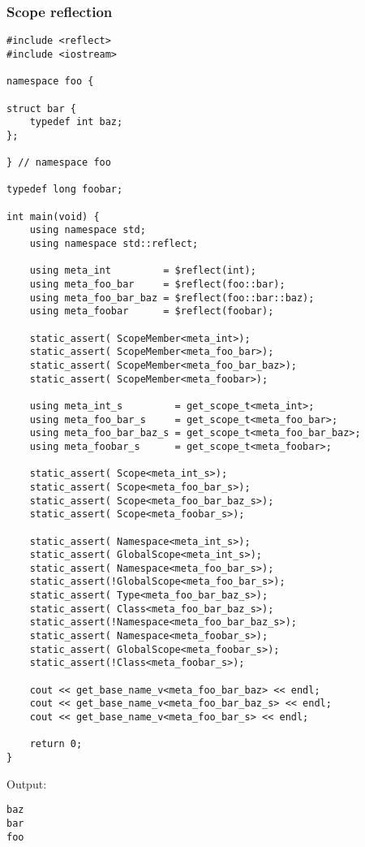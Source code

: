 \subsubsection{Scope reflection}

\begin{verbatim}
#include <reflect>
#include <iostream>

namespace foo {

struct bar {
	typedef int baz;
};

} // namespace foo

typedef long foobar;

int main(void) {
	using namespace std;
	using namespace std::reflect;

	using meta_int         = $reflect(int);
	using meta_foo_bar     = $reflect(foo::bar);
	using meta_foo_bar_baz = $reflect(foo::bar::baz);
	using meta_foobar      = $reflect(foobar);

	static_assert( ScopeMember<meta_int>);
	static_assert( ScopeMember<meta_foo_bar>);
	static_assert( ScopeMember<meta_foo_bar_baz>);
	static_assert( ScopeMember<meta_foobar>);

	using meta_int_s         = get_scope_t<meta_int>;
	using meta_foo_bar_s     = get_scope_t<meta_foo_bar>;
	using meta_foo_bar_baz_s = get_scope_t<meta_foo_bar_baz>;
	using meta_foobar_s      = get_scope_t<meta_foobar>;

	static_assert( Scope<meta_int_s>);
	static_assert( Scope<meta_foo_bar_s>);
	static_assert( Scope<meta_foo_bar_baz_s>);
	static_assert( Scope<meta_foobar_s>);

	static_assert( Namespace<meta_int_s>);
	static_assert( GlobalScope<meta_int_s>);
	static_assert( Namespace<meta_foo_bar_s>);
	static_assert(!GlobalScope<meta_foo_bar_s>);
	static_assert( Type<meta_foo_bar_baz_s>);
	static_assert( Class<meta_foo_bar_baz_s>);
	static_assert(!Namespace<meta_foo_bar_baz_s>);
	static_assert( Namespace<meta_foobar_s>);
	static_assert( GlobalScope<meta_foobar_s>);
	static_assert(!Class<meta_foobar_s>);

	cout << get_base_name_v<meta_foo_bar_baz> << endl;
	cout << get_base_name_v<meta_foo_bar_baz_s> << endl;
	cout << get_base_name_v<meta_foo_bar_s> << endl;

	return 0;
}
\end{verbatim}

Output:

\begin{verbatim}
baz
bar
foo
\end{verbatim}

